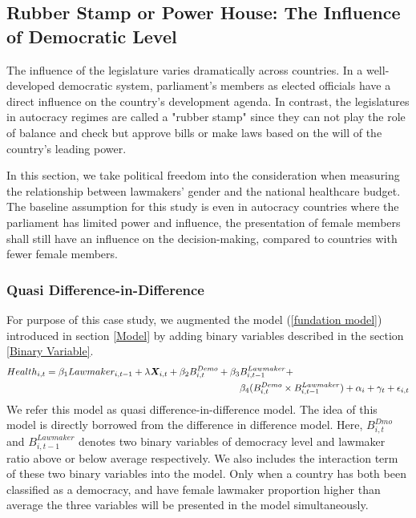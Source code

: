 \subsection{Rubber Stamp or Power House: The Influence of Democratic Level}
\label{democracy compare}
The influence of the legislature varies dramatically across countries.
In a well-developed democratic system, parliament's members as elected officials have a direct influence on the country's development agenda.
In contrast, the legislatures in autocracy regimes are called a "rubber stamp" since they can not play the role of balance and check but approve bills or make laws based on the will of the country's leading power. 

In this section, we take political freedom into the consideration when measuring the relationship between lawmakers' gender and the national healthcare budget.
The baseline assumption for this study is even in autocracy countries where the parliament has limited power and influence, the presentation of female members shall still have an influence on the decision-making, compared to countries with fewer female members. 

\subsubsection{Quasi Difference-in-Difference}
\label{QDID}

For purpose of this case study, we augmented the model (\ref{fundation model}) introduced in section \ref{Model} by adding binary variables described in the section \ref{Binary Variable}.
\begin{align}
\label{DID model}	
	Health_{i,t} = \beta_1Lawmaker_{i, t-1} + \lambda\boldsymbol{X}_{i,t} + \beta_{2}B^{Demo}_{i,t} + \beta_3&B^{Lawmaker}_{i, t - 1} +\\ \notag
	&\beta_4(B^{Demo}_{i, t}\times B^{Lawmaker}_{i, t-1}) + \alpha_i + \gamma_t + \epsilon_{i, t}
\end{align}
We refer this model as quasi difference-in-difference model.
The idea of this model is directly borrowed from the difference in difference model.
Here, $B^{Dmo}_{i, t}$ and $B^{Lawmaker}_{i, t-1}$ denotes two binary variables of democracy level and lawmaker ratio above or below average respectively.
We also includes the interaction term of these two binary variables into the model. 
Only when a country has both been classified as a democracy, and have female lawmaker proportion higher than average the three variables will be presented in the model simultaneously. 


